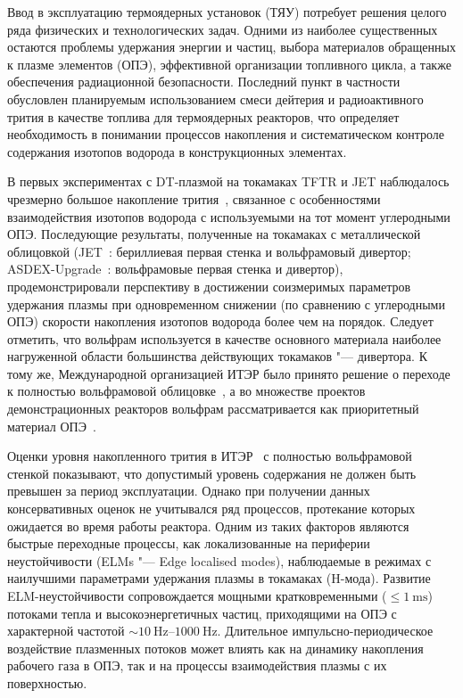 Ввод в эксплуатацию термоядерных установок (ТЯУ) потребует решения целого ряда физических и технологических задач. Одними из наиболее существенных остаются проблемы удержания энергии и частиц, выбора материалов обращенных к плазме элементов (ОПЭ), эффективной организации топливного цикла, а также обеспечения радиационной безопасности. Последний пункт в частности обусловлен планируемым использованием смеси дейтерия и радиоактивного трития в качестве топлива для термоядерных реакторов, что определяет необходимость в понимании процессов накопления и систематическом контроле содержания изотопов водорода в конструкционных элементах.

В первых экспериментах с DT-плазмой на токамаках TFTR и JET наблюдалось чрезмерно большое накопление трития~\cite{Gasparyan2024}, связанное с особенностями взаимодействия изотопов водорода с используемыми на тот момент углеродными ОПЭ. Последующие результаты, полученные на токамаках с металлической облицовкой (JET~\cite{Maggi2024,Kappatou2025}: бериллиевая первая стенка и вольфрамовый дивертор; ASDEX-Upgrade~\cite{Rohde2009}: вольфрамовые первая стенка и дивертор), продемонстрировали перспективу в достижении соизмеримых параметров удержания плазмы при одновременном снижении (по сравнению с углеродными ОПЭ) скорости накопления изотопов водорода более чем на порядок. Следует отметить, что вольфрам используется в качестве основного материала наиболее нагруженной области большинства действующих токамаков "--- дивертора. К тому же, Международной организацией ИТЭР было принято решение о переходе к полностью вольфрамовой облицовке~\cite{Barabaschi2025}, а во множестве проектов демонстрационных реакторов вольфрам рассматривается как приоритетный материал ОПЭ~\cite{Bachmann2016}.

Оценки уровня накопленного трития в ИТЭР~\cite{Roth1,Pitts2025} с полностью вольфрамовой стенкой показывают, что допустимый уровень содержания не должен быть превышен за период эксплуатации. Однако при получении данных консервативных оценок не учитывался ряд процессов, протекание которых ожидается во время работы реактора. Одним из таких факторов являются быстрые переходные процессы, как локализованные на периферии неустойчивости (ELMs "--- Edge localised modes), наблюдаемые в режимах с наилучшими параметрами удержания плазмы в токамаках (H-мода). Развитие ELM-неустойчивости сопровождается мощными кратковременными ($\leq\SI{1}{\milli\second}$) потоками тепла и высокоэнергетичных частиц, приходящими на ОПЭ с характерной частотой \(\sim \SIrange{10}{1000}{\hertz}\). Длительное импульсно-периодическое воздействие плазменных потоков может влиять как на динамику накопления рабочего газа в ОПЭ, так и на процессы взаимодействия плазмы с их поверхностью.

